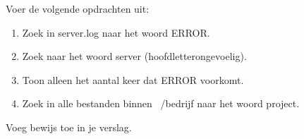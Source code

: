 Voer de volgende opdrachten uit:
\begin{enumerate}
\item Zoek in server.log naar het woord ERROR.
\item Zoek naar het woord server (hoofdletterongevoelig).
\item Toon alleen het aantal keer dat ERROR voorkomt.
\item Zoek in alle bestanden binnen ~/bedrijf naar het woord project.
\end{enumerate}

Voeg bewijs toe in je verslag.

